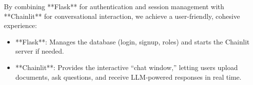 \noindent
By combining **Flask** for authentication and session management with **Chainlit** for conversational interaction, we achieve a user-friendly, cohesive experience:
\begin{itemize}
    \item **Flask**: Manages the database (login, signup, roles) and starts the Chainlit server if needed.
    \item **Chainlit**: Provides the interactive “chat window,” letting users upload documents, ask questions, and receive LLM-powered responses in real time.
\end{itemize}






